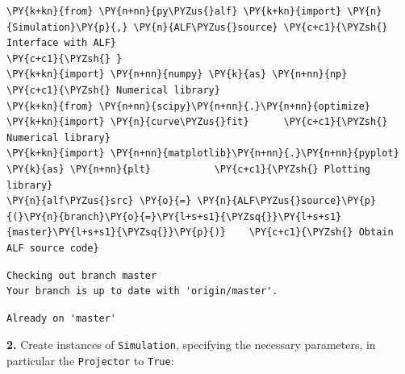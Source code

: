     \begin{tcolorbox}[breakable, size=fbox, boxrule=1pt, pad at break*=1mm,colback=cellbackground, colframe=cellborder]
\begin{Verbatim}[commandchars=\\\{\}]
\PY{k+kn}{from} \PY{n+nn}{py\PYZus{}alf} \PY{k+kn}{import} \PY{n}{Simulation}\PY{p}{,} \PY{n}{ALF\PYZus{}source} \PY{c+c1}{\PYZsh{} Interface with ALF}
\PY{c+c1}{\PYZsh{} }
\PY{k+kn}{import} \PY{n+nn}{numpy} \PY{k}{as} \PY{n+nn}{np}                        \PY{c+c1}{\PYZsh{} Numerical library}
\PY{k+kn}{from} \PY{n+nn}{scipy}\PY{n+nn}{.}\PY{n+nn}{optimize} \PY{k+kn}{import} \PY{n}{curve\PYZus{}fit}      \PY{c+c1}{\PYZsh{} Numerical library}
\PY{k+kn}{import} \PY{n+nn}{matplotlib}\PY{n+nn}{.}\PY{n+nn}{pyplot} \PY{k}{as} \PY{n+nn}{plt}           \PY{c+c1}{\PYZsh{} Plotting library}
\PY{n}{alf\PYZus{}src} \PY{o}{=} \PY{n}{ALF\PYZus{}source}\PY{p}{(}\PY{n}{branch}\PY{o}{=}\PY{l+s+s1}{\PYZsq{}}\PY{l+s+s1}{master}\PY{l+s+s1}{\PYZsq{}}\PY{p}{)}    \PY{c+c1}{\PYZsh{} Obtain ALF source code}
\end{Verbatim}
\end{tcolorbox}

    \begin{Verbatim}[commandchars=\\\{\}]
Checking out branch master
Your branch is up to date with 'origin/master'.
    \end{Verbatim}

    \begin{Verbatim}[commandchars=\\\{\}]
Already on 'master'
    \end{Verbatim}

    \textbf{2.} Create instances of \texttt{Simulation}, specifying the
necessary parameters, in particular the \texttt{Projector} to
\texttt{True}:

